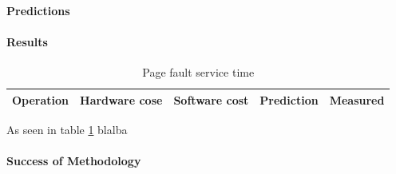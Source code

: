 \paragraph{Predictions}


\paragraph{Results}
\begin{table}[h]
\begin{center}
\begin{tabular}{| l | l | l | l | l |}
\hline
Operation & Hardware cose & Software cost & Prediction & Measured \\
\hline
\end{tabular}
\end{center}
\caption{Page fault service time\label{tab:page-fault}}

\end{table}

As seen in table \ref{tab:page-fault} blalba
\paragraph{Success of Methodology}

